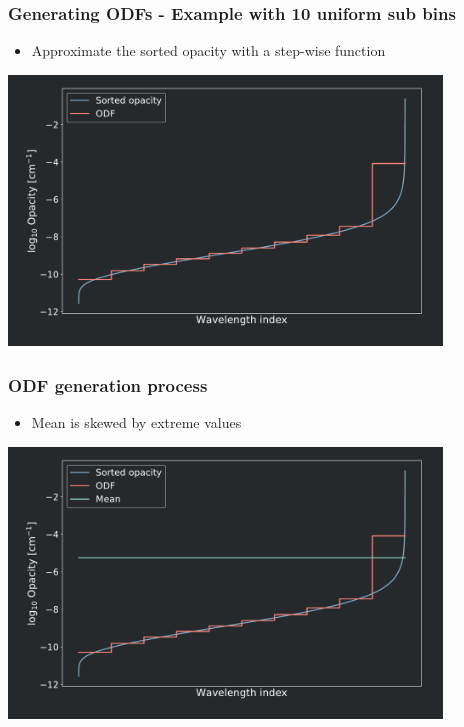 \frame
{
	\frametitle{Generating ODFs - Example with 10 uniform sub bins}
	\begin{itemize}
		\item Approximate the sorted opacity with a step-wise function
	\end{itemize}
	\centering
	\includegraphics[width=115mm]{images/odf_generation_process_3}
}
\frame
{
	\frametitle{ODF generation process}
	\begin{itemize}
	\item Mean is skewed by extreme values
	\end{itemize}
	\centering
	\includegraphics[width=115mm]{images/odf_generation_process_4}
}

